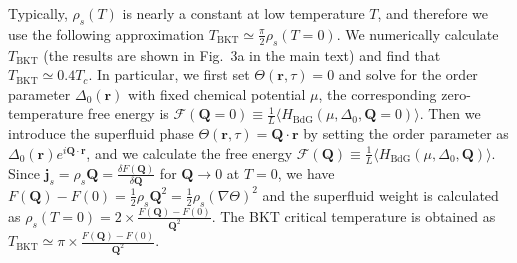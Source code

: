 \documentclass[twocolumn,english,prl,floatfix,citeautoscript,nofootinbib]{revtex4}
\begin{document}
\begin{widetext}
Typically, $\rho _{s}(T)$ is
nearly a constant at low temperature $T$, and therefore we use the following
approximation $T_{\text{BKT}}\simeq \frac{\pi }{2}\rho _{s}(T=0)$. We
numerically calculate $T_{\text{BKT}}$ (the results are shown in Fig.~3a in
the main text) and find that $T_{\text{BKT}}\simeq 0.4T_{c}$. In particular,
we first set $\Theta (\mathbf{r},\tau)=0$ and solve for the order parameter $%
\Delta _{0}(\mathbf{r})$ with fixed chemical potential $\mu $, the
corresponding zero-temperature free energy is $\mathcal{F}(\mathbf{Q}%
=0)\equiv \frac{1}{L}\langle H_{\text{BdG}}(\mu ,\Delta _{0},\mathbf{Q}%
=0)\rangle $. Then we introduce the superfluid phase $\Theta (\mathbf{r},\tau)=%
\mathbf{Q}\cdot \mathbf{r}$ by setting the order parameter as $\Delta _{0}(%
\mathbf{r})e^{i\mathbf{Q}\cdot \mathbf{r}}$, and we calculate the free
energy $\mathcal{F}(\mathbf{Q})\equiv \frac{1}{L}\langle H_{\text{BdG}}(\mu
,\Delta _{0},\mathbf{Q})\rangle $. Since $\mathbf{j}_{s}=\rho _{s}\mathbf{Q}=%
\frac{\delta F(\mathbf{Q})}{\delta \mathbf{Q}}$ for $\mathbf{Q}\rightarrow 0$
at $T=0$, we have $F(\mathbf{Q})-F(0)=\frac{1}{2}\rho _{s}\mathbf{Q}^{2}=%
\frac{1}{2}\rho _{s}(\nabla \Theta )^{2}$ and the superfluid weight is
calculated as $\rho _{s}(T=0)=2\times \frac{F(\mathbf{Q})-F(0)}{\mathbf{Q}%
^{2}}$. The BKT critical temperature is obtained as $T_{\text{BKT}}\simeq
\pi \times \frac{F(\mathbf{Q})-F(0)}{\mathbf{Q}^{2}}$.


\end{widetext}
\end{document}
